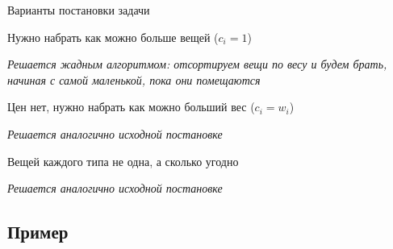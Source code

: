 \begin{frame}[t]{Варианты постановки задачи}
\begin{itemize}
    {%
    \item Нужно набрать как можно больше вещей ($c_i = 1$) \\
    }%
    {%
     \textit{Решается жадным алгоритмом:
      отсортируем вещи по весу и будем брать, начиная с самой маленькой,
      пока они помещаются}
    }%
    {%
    \item Цен нет, нужно набрать как можно больший вес ($c_i = w_i$) \\
    }%
    {%
     \textit{Решается аналогично исходной постановке}
    }%
    {%
    \item Вещей каждого типа не одна, а сколько угодно \\
    }%
    {%
     \textit{Решается аналогично исходной постановке}
    }%
\end{itemize}
\end{frame}

\subsection{Пример}

